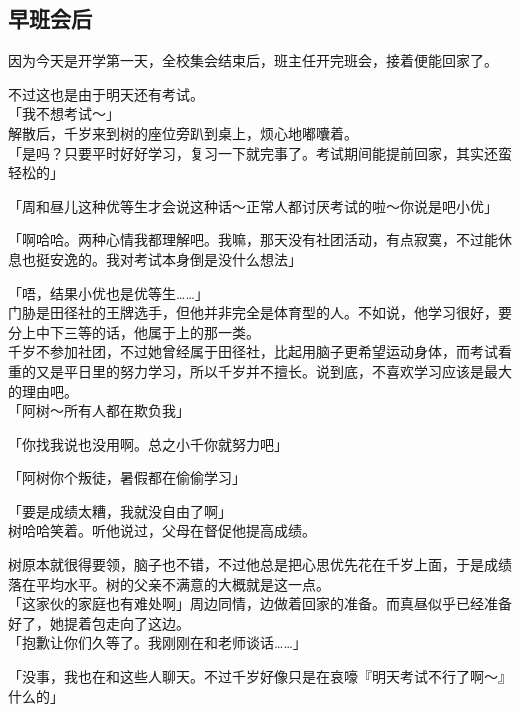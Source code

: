\subsection{早班会后}

因为今天是开学第一天，全校集会结束后，班主任开完班会，接着便能回家了。

不过这也是由于明天还有考试。\\

「我不想考试～」\\

解散后，千岁来到树的座位旁趴到桌上，烦心地嘟囔着。\\

「是吗？只要平时好好学习，复习一下就完事了。考试期间能提前回家，其实还蛮轻松的」

「周和昼儿这种优等生才会说这种话～正常人都讨厌考试的啦～你说是吧小优」

「啊哈哈。两种心情我都理解吧。我嘛，那天没有社团活动，有点寂寞，不过能休息也挺安逸的。我对考试本身倒是没什么想法」

「唔，结果小优也是优等生……」\\

门胁是田径社的王牌选手，但他并非完全是体育型的人。不如说，他学习很好，要分上中下三等的话，他属于上的那一类。\\

千岁不参加社团，不过她曾经属于田径社，比起用脑子更希望运动身体，而考试看重的又是平日里的努力学习，所以千岁并不擅长。说到底，不喜欢学习应该是最大的理由吧。\\

「阿树～所有人都在欺负我」

「你找我说也没用啊。总之小千你就努力吧」

「阿树你个叛徒，暑假都在偷偷学习」

「要是成绩太糟，我就没自由了啊」\\

树哈哈笑着。听他说过，父母在督促他提高成绩。

树原本就很得要领，脑子也不错，不过他总是把心思优先花在千岁上面，于是成绩落在平均水平。树的父亲不满意的大概就是这一点。\\

「这家伙的家庭也有难处啊」周边同情，边做着回家的准备。而真昼似乎已经准备好了，她提着包走向了这边。\\

「抱歉让你们久等了。我刚刚在和老师谈话……」

「没事，我也在和这些人聊天。不过千岁好像只是在哀嚎『明天考试不行了啊～』什么的」


